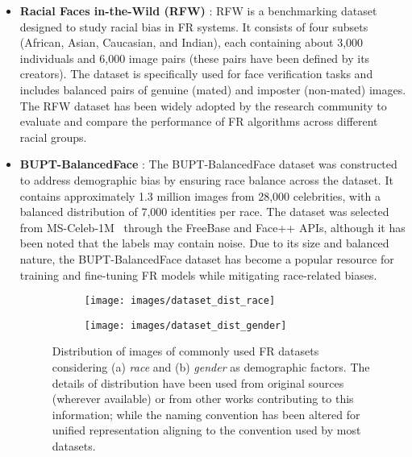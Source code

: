 \begin{itemize}
\item \textbf{Racial Faces in-the-Wild (RFW)} \cite{wang2019racial}:
RFW is a benchmarking dataset designed to study racial bias in FR
systems. It consists of four subsets (African, Asian, Caucasian, and Indian),
each containing about 3,000 individuals and 6,000
image pairs (these pairs have been defined by its creators). The dataset is
specifically used for face verification tasks and includes balanced pairs of
genuine (mated) and imposter (non-mated) images. The RFW dataset has been widely
adopted by the research community to evaluate and compare the
performance of FR algorithms across different racial groups.

\item \textbf{BUPT-BalancedFace} \cite{wang2020mitigating}:
The BUPT-BalancedFace dataset was constructed to address demographic bias by
ensuring race balance across the dataset. It contains approximately 1.3 million
images from 28,000 celebrities, with a balanced distribution of 7,000 identities
per race. The dataset was selected from MS-Celeb-1M~\cite{guo2016ms} through
the FreeBase and Face++ APIs, although it has been noted that the labels may
contain noise. Due to its size and balanced nature, the BUPT-BalancedFace dataset has become
a popular resource for training and fine-tuning FR models while mitigating
race-related biases.

\begin{figure*}[h]
\centering
\begin{subfigure}{0.98\columnwidth}
\texttt{[image: images/dataset\_dist\_race]}
\caption{}
\label{fig:race11}
\end{subfigure}
%
\hfill
%
\begin{subfigure}{0.98\columnwidth}
\texttt{[image: images/dataset\_dist\_gender]}
\caption{}
\label{fig:gender11}
\end{subfigure}
%    
\caption{Distribution of images of commonly used FR datasets considering
(a) \textit{race} and (b) \textit{gender} as demographic factors. The details of distribution have
been used from original sources (wherever available) or from other
works contributing to this information; while the naming convention has
been altered for unified representation aligning to the convention used
by most datasets.}
\label{fig:dataset_dist}
\end{figure*}
        


\end{itemize}
